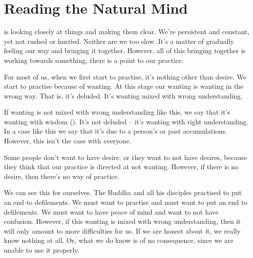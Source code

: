 
\chapter{Reading the Natural Mind}

 is looking closely at things and making them clear. We're persistent and constant, yet not rushed or hurried. Neither are we too slow. It's a matter of gradually feeling our way and bringing it together. However, all of this bringing together is working towards something, there is a point to our practice.

For most of us, when we first start to practise, it's nothing other than desire. We start to practise because of wanting. At this stage our wanting is wanting in the wrong way. That is, it's deluded. It's wanting mixed with wrong understanding.

If wanting is not mixed with wrong understanding like this, we say that it's wanting with wisdom (). It's not deluded -- it's wanting with right understanding. In a case like this we say that it's due to a person's  or past accumulations. However, this isn't the case with everyone.

Some people don't want to have desire, or they want to not have desires, because they think that our practice is directed at not wanting. However, if there is no desire, then there's no way of practice.

We can see this for ourselves. The Buddha and all his disciples practised to put an end to defilements. We must want to practise and must want to put an end to defilements. We must want to have peace of mind and want to not have confusion. However, if this wanting is mixed with wrong understanding, then it will only amount to more difficulties for us. If we are honest about it, we really know nothing at all. Or, what we do know is of no consequence, since we are unable to use it properly.

